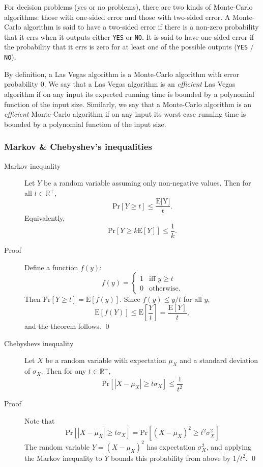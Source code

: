 For decision problems (yes or no problems), there are two kinds of Monte-Carlo
algorithms: those with one-sided error and those with two-sided error. A
Monte-Carlo algorithm is said to have a two-sided error if there is a non-zero
probability that it errs when it outputs either \texttt{YES} or \texttt{NO}. It is said
to have one-sided error if the probability that it errs is zero for at least one of the
possible outputs (\texttt{YES} / \texttt{NO}).

By definition, a Las Vegas algorithm is a Monte-Carlo algorithm with error
probability $0$. We say that a Las Vegas algorithm is an \textit{efficient}
Las Vegas algorithm if on any input its expected running time is bounded by a
polynomial function of the input size. Similarly, we say that a Monte-Carlo
algorithm is an \textit{efficient} Monte-Carlo algorithm if on any input its
worst-case running time is bounded by a polynomial function of the input size.

\subsubsection{Markov \& Chebyshev's inequalities}
\begin{description}
\item[Markov inequality] Let $Y$ be a random variable assuming only non-negative
  values. Then for all $t \in \mathbb{R}^+$,
  \[
    \text{Pr}[Y \geq t] \leq \frac{\text{E[Y]}}{t}.
  \]
  Equivalently,
  \[
    \text{Pr}[Y \geq k\text{E}[Y]] \leq \frac{1}{k}.
  \]
\item[Proof] Define a function $f(y)$:
  \[
   f(y) = \begin{cases}
     1 & \text{iff } y \geq t\\
     0 & \text{otherwise.}
   \end{cases}
  \]
  Then $\text{Pr}[Y \geq t] = \text{E}[f(y)]$. Since $f(y) \leq y/t$ for all $y$,
  \[
    \text{E}[f(Y)] \leq \text{E}\left [\frac{Y}{t} \right ] = \frac{\text{E}[Y]}{t},
  \]
  and the theorem follows. \qed
\end{description}

\begin{description}
\item[Chebyshevs inequality] Let $X$ be a random variable with expectation
  $\mu_X$ and a standard deviation of $\sigma_X$. Then for any $t \in
  \mathbb{R}^+$,
  \[
    \text{Pr}[|X - \mu_X| \geq t\sigma_X] \leq \frac{1}{t^2}
  \]
\item[Proof] Note that
  \[
    \text{Pr}[|X - \mu_X| \geq t\sigma_X] = \text{Pr}[(X - \mu_X)^2 \geq
    t^2\sigma_X^2]
  \]
  The random variable $Y = (X - \mu_X)^2$ has expectation $\sigma_X^2$, and
  applying the Markov inequality to $Y$ bounds this probability from above by
  $1/t^2$. \qed
\end{description}